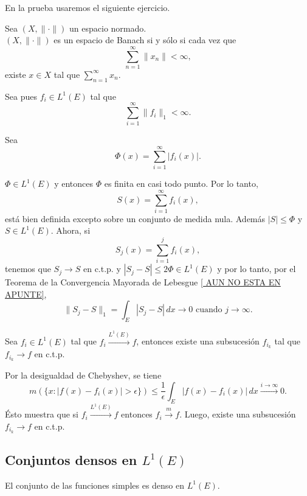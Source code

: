 \begin{demo}
En la prueba 
usaremos el siguiente ejercicio.

\begin{ejercicio}{}
Sea $(X,\| \cdot\|)$ un espacio normado. \\
$(X,\| \cdot\|)$ es un espacio de Banach si y s\'olo si cada vez que 
\[
\sum\limits_{n=1}^{\infty} \|x_n\|<\infty,
\]
existe $x \in X$ tal que $\sum\limits_{n=1}^{\infty} x_n$.
\end{ejercicio}

Sea pues $f_i \in L^1(E)$ tal que 
\[
\sum\limits_{i=1}^{\infty} \|f_i\|_1<\infty.
\]

Sea \[ \Phi(x)=\sum\limits_{i=1}^{\infty} |f_i(x)|.\]

$\Phi \in L^1(E)$ y entonces $\Phi$ es finita en casi todo punto. Por lo tanto, 
\[
S(x)=\sum\limits_{i=1}^{\infty} f_i(x),
\]
est\'a bien definida excepto sobre un conjunto de medida nula.
%
Adem\'as $|S|\leq \Phi$ y  $S\in L^1(E)$.
%
Ahora, si 
\[
S_j(x)=\sum\limits_{i=1}^j f_i(x),
\]
tenemos que $S_j \to S$ en c.t.p. y $|S_j-S|\leq 2\Phi \in L^1(E)$ y por lo tanto, por el Teorema de la Convergencia Mayorada de Lebesgue \ref{ AUN NO ESTA EN APUNTE}, 
\[
\|S_j-S\|_1=\int_E |S_j-S|\,dx \to 0 \mbox{ cuando } j \to \infty.
\]
\end{demo}

\begin{teorema}{}
Sea $f_i \in L^1(E)$ tal que $f_i \xrightarrow{L^1(E)} f$, entonces existe una subsucesi\'on $f_{i_k}$ tal que $f_{i_k}\to f$ en c.t.p.
\end{teorema}

\begin{demo}
Por la desigualdad de Chebyshev, se tiene
\[
m(\{x:|f(x)-f_i(x)|>\epsilon \})\leq 
\frac{1}{\epsilon}\int_E |f(x)-f_i(x)|\,dx \xrightarrow{i \to \infty}0.
\]
\'Esto muestra que si $f_i \xrightarrow{L^1(E)} f$ entonces
$f_i \xrightarrow{m} f$.
Luego, existe una subsucesi\'on $f_{i_k}\to f$ en c.t.p.
\end{demo}

\subsection{Conjuntos densos en $L^1(E)$}

\begin{teorema}{}
El conjunto de las funciones simples es denso en $L^1(E)$.
\end{teorema}

